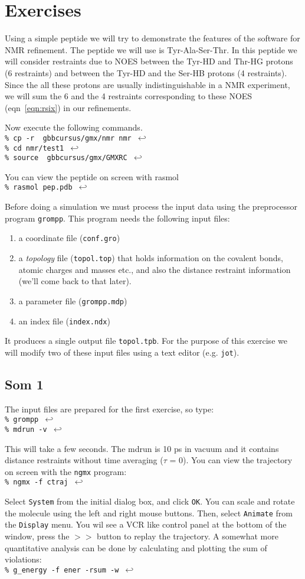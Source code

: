 \documentclass[11pt,dvips]{article}
\renewcommand{\type}[1]{\\ {\tt \% #1 $\hookleftarrow$}}
\begin{document}
\section{Exercises}
Using a simple peptide we will try to demonstrate the features
of the {\gromacs} software for NMR refinement.
The peptide we will use is Tyr-Ala-Ser-Thr.
In this peptide we will consider restraints 
due to NOES between the Tyr-HD and Thr-HG protons (6 restraints)
and between the Tyr-HD and the Ser-HB protons (4 restraints).
Since the all these protons are 
usually indistinguishable in a NMR experiment, we will sum the 6 and the
4 restraints
corresponding to these NOES (eqn~\ref{eqn:rsix}) in our refinements.

Now execute the following commands.
\type{cp -r ~gbbcursus/gmx/nmr nmr}
\type{cd nmr/test1}
\type{source ~gbbcursus/gmx/GMXRC}

You can view the peptide on screen with rasmol
\type{rasmol pep.pdb}

Before doing a simulation we must process the input data using
the {\gromacs} preprocessor program {\tt grompp}. This program needs
the following input files:
\begin{enumerate}
\item	a coordinate file ({\tt conf.gro})
\item	a {\em topology} file ({\tt topol.top}) that holds information on the
	covalent bonds, atomic charges and masses etc., and also the 
	distance restraint information (we'll come back to that later).
\item	a parameter file ({\tt grompp.mdp})
\item	an index file ({\tt index.ndx})
\end{enumerate}
It produces a single output file {\tt topol.tpb}.
For the purpose of this exercise we will modify two of these input files
using a text editor (e.g. {\tt jot}).

\subsection{Som 1}
The input files are prepared for the first exercise, so type:
\type{grompp}
\type{mdrun -v}

This will take a few seconds. The mdrun is 10 ps in vacuum and it contains
distance restraints without time averaging ($\tau$ = 0).
You can view the trajectory on screen with the {\tt ngmx} program:
\type{ngmx -f ctraj}

Select {\tt System} from the initial dialog box, and click {\tt OK}.
You can scale and rotate the molecule using the left and right mouse
buttons. Then, select {\tt Animate} from the {\tt Display} menu.
You wil see a VCR like control panel at the bottom of the window, press
the $>>$ button to replay the trajectory.
A somewhat more quantitative analysis can be done by calculating and
plotting the sum of violations:
\type{g\_energy -f ener -rsum -w}
\end{document}
